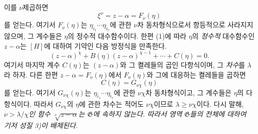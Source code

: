 
이를 $\nu$제곱하면
\[
 \xi^\nu=z-\alpha=F_\nu(\eta)
\]
를 얻는다. 여기서 $F_\nu(\eta)$는 $\eta_{i_1}\cdots\eta_{i_\tau}$에 관한 $\nu$차 동차형식으로서 항등적으로 사라지지 않으며, 그 계수들은 $\eta$의 정수적 대수함수이다. 한편 (1)에 따라 $\eta$의 \emph{정수적} 대수함수인 $z-\alpha$는 $[H]$에 대하여 기약인 다음 방정식을 만족한다.
\[
 (z-\alpha)^\chi+B(\eta)(z-\alpha)^{\chi-1}+\cdots+C(\eta)=0.
\]
여기서 마지막 계수 $C(\eta)$는 $(z-\alpha)$와 그 켤레들의 곱인 다항식이며, 그 \emph{차수}를 $\lambda$라 하자. 다른 한편 $z-\alpha=F_\nu(\eta)$에서 $F_\nu(\eta)$와 그에 대응하는 켤레들을 곱하면
\[
 C(\eta)=G_{\nu\chi}(\eta)
\]
를 얻는다. 여기서 $G_{\nu\chi}(\eta)$는 $\eta_{i_1}\cdots\eta_{i_\tau}$에 관한 $\nu\chi$차 동차형식이고, 그 계수들은 $\eta$의 다항식이다. 따라서 $G_{\nu\chi}$의 $\eta$에 관한 차수는 적어도 $\nu\chi$이므로 $\lambda\geq\nu\chi$이다. 다시 말해, \emph{$\nu>\lambda/\chi$인 함수 $\sqrt[\nu]{z-\alpha}$는 $\mathfrak G$에 속하지 않는다. 따라서 영역 $\mathfrak G$들의 전체에 대하여 기저 성질 3)이 배제된다.}
